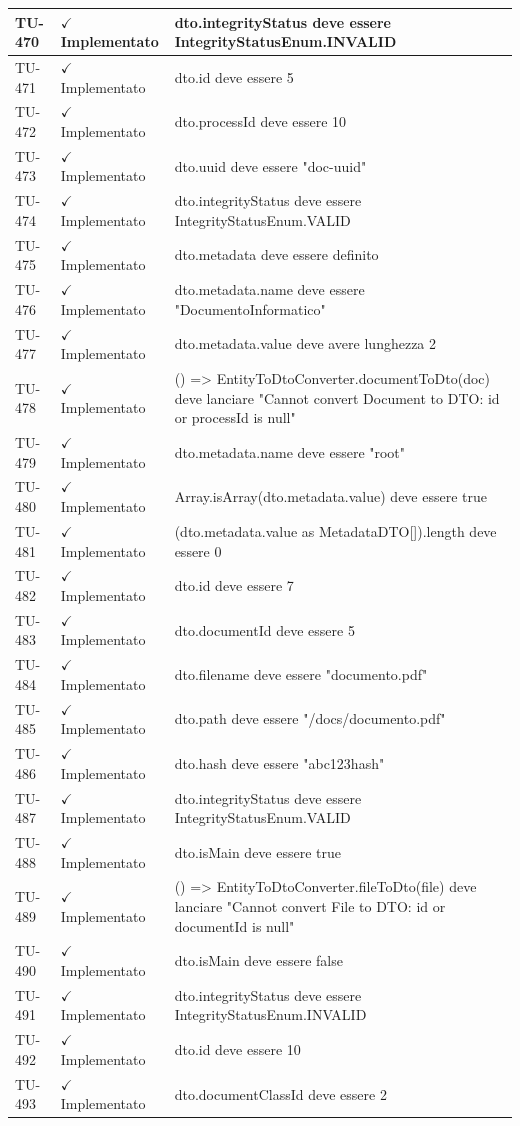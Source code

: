 ﻿\documentclass[a4paper,12pt]{article}
\newcommand{\ok}{\textcolor{green!60!black}{$\checkmark$ Implementato}}
\begin{document}
\begin{longtable}{|p{2cm}|p{3.5cm}|p{9.5cm}|}
\hline
TU-470 & \ok & dto.integrityStatus deve essere IntegrityStatusEnum.INVALID \\
\hline
TU-471 & \ok & dto.id deve essere 5 \\
\hline
TU-472 & \ok & dto.processId deve essere 10 \\
\hline
TU-473 & \ok & dto.uuid deve essere "doc-uuid" \\
\hline
TU-474 & \ok & dto.integrityStatus deve essere IntegrityStatusEnum.VALID \\
\hline
TU-475 & \ok & dto.metadata deve essere definito \\
\hline
TU-476 & \ok & dto.metadata.name deve essere "DocumentoInformatico" \\
\hline
TU-477 & \ok & dto.metadata.value deve avere lunghezza 2 \\
\hline
TU-478 & \ok & () => EntityToDtoConverter.documentToDto(doc) deve lanciare "Cannot convert Document to DTO: id or processId is null" \\
\hline
TU-479 & \ok & dto.metadata.name deve essere "root" \\
\hline
TU-480 & \ok & Array.isArray(dto.metadata.value) deve essere true \\
\hline
TU-481 & \ok & (dto.metadata.value as MetadataDTO[]).length deve essere 0 \\
\hline
TU-482 & \ok & dto.id deve essere 7 \\
\hline
TU-483 & \ok & dto.documentId deve essere 5 \\
\hline
TU-484 & \ok & dto.filename deve essere "documento.pdf" \\
\hline
TU-485 & \ok & dto.path deve essere "/docs/documento.pdf" \\
\hline
TU-486 & \ok & dto.hash deve essere "abc123hash" \\
\hline
TU-487 & \ok & dto.integrityStatus deve essere IntegrityStatusEnum.VALID \\
\hline
TU-488 & \ok & dto.isMain deve essere true \\
\hline
TU-489 & \ok & () => EntityToDtoConverter.fileToDto(file) deve lanciare "Cannot convert File to DTO: id or documentId is null" \\
\hline
TU-490 & \ok & dto.isMain deve essere false \\
\hline
TU-491 & \ok & dto.integrityStatus deve essere IntegrityStatusEnum.INVALID \\
\hline
TU-492 & \ok & dto.id deve essere 10 \\
\hline
TU-493 & \ok & dto.documentClassId deve essere 2 \\

\end{longtable}
\end{document}
